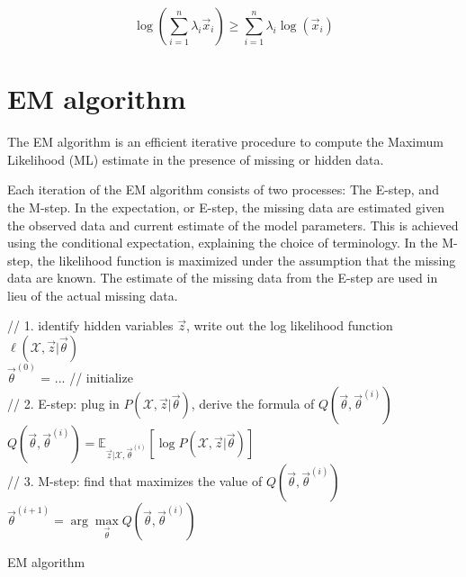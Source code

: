 \begin{proposition}
\begin{equation}
\log\left(\sum\limits_{i=1}^n \lambda_i\vec{x}_i\right) \geq \sum\limits_{i=1}^n {\lambda_i \log(\vec{x}_i)}
\end{equation}
\end{proposition}


\section{EM algorithm}
The EM algorithm is an efficient iterative procedure to compute the Maximum Likelihood (ML) estimate in the presence of missing or hidden data. 

Each iteration of the EM algorithm consists of two processes: The E-step, and the M-step. In the expectation, or E-step, the missing data are estimated given the observed data and current estimate of the model parameters. This is achieved using the conditional expectation, explaining the choice of terminology. In the M-step, the likelihood function is maximized under the assumption that the missing data are known. The estimate of the missing data from the E-step are used in lieu of the actual missing data.

\begin{algorithm}[htbp]

	// 1. identify hidden variables $\vec{z}$, write out the log likelihood function $\ell(\mathcal{X},\vec{z}|\vec{\theta})$ \\
	$\vec{\theta}^{(0)}$ = ... // initialize \\
	
	 {
	    // 2. E-step: plug in $P(\mathcal{X},\vec{z}|\vec{\theta})$, derive the formula of $Q(\vec{\theta}, \vec{\theta}^{(i)})$ \\
	    $Q(\vec{\theta}, \vec{\theta}^{(i)})=\mathbb{E}_{\vec{z}|\mathcal{X},\vec{\theta}^{(i)}}\left[\log P(\mathcal{X},\vec{z}|\vec{\theta})\right]$ \\
	    // 3. M-step: find \vec{\theta} that maximizes the value of $Q(\vec{\theta}, \vec{\theta}^{(i)})$ \\
		$\vec{\theta}^{(i+1)}=\arg\max\limits_{\vec{\theta}} Q(\vec{\theta}, \vec{\theta}^{(i)})$ \\
	}
	
\caption{EM algorithm}
\end{algorithm}

